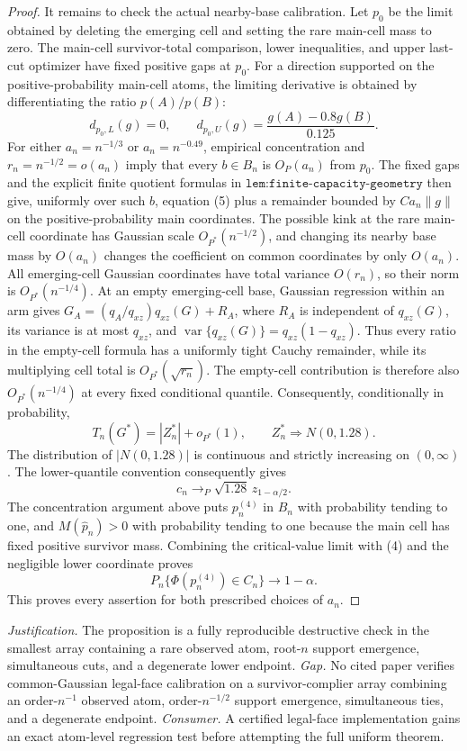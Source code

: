\documentclass{article}
\begin{document}
\begin{proof}
It remains to check the actual nearby-base calibration.  Let \(p_0\) be the limit obtained by deleting the emerging cell and setting the rare main-cell mass to zero.  The main-cell survivor-total comparison, lower inequalities, and upper last-cut optimizer have fixed positive gaps at \(p_0\).  For a direction supported on the positive-probability main-cell atoms, the limiting derivative is obtained by differentiating the ratio \(p(A)/p(B)\):
\[
d_{p_0,L}(g)=0,
\qquad
d_{p_0,U}(g)=\frac{g(A)-0.8g(B)}{0.125}.
\tag{5}
\]
For either \(a_n=n^{-1/3}\) or \(a_n=n^{-0.49}\), empirical concentration and \(r_n=n^{-1/2}=o(a_n)\) imply that every \(b\in B_n\) is \(O_P(a_n)\) from \(p_0\).  The fixed gaps and the explicit finite quotient formulas in \(\texttt{lem:finite-capacity-geometry}\) then give, uniformly over such \(b\), equation (5) plus a remainder bounded by \(C a_n\|g\|\) on the positive-probability main coordinates.  The possible kink at the rare main-cell coordinate has Gaussian scale \(O_{P^*}(n^{-1/2})\), and changing its nearby base mass by \(O(a_n)\) changes the coefficient on common coordinates by only \(O(a_n)\).  All emerging-cell Gaussian coordinates have total variance \(O(r_n)\), so their norm is \(O_{P^*}(n^{-1/4})\).  At an empty emerging-cell base, Gaussian regression within an arm gives \(G_A=(q_A/q_{xz})q_{xz}(G)+R_A\), where \(R_A\) is independent of \(q_{xz}(G)\), its variance is at most \(q_{xz}\), and \(\operatorname{var}\{q_{xz}(G)\}=q_{xz}(1-q_{xz})\).  Thus every ratio in the empty-cell formula has a uniformly tight Cauchy remainder, while its multiplying cell total is \(O_{P^*}(\sqrt{r_n})\).  The empty-cell contribution is therefore also \(O_{P^*}(n^{-1/4})\) at every fixed conditional quantile.  Consequently, conditionally in probability,
\[
T_n(G^*)=|Z_n^*|+o_{P^*}(1),
\qquad
Z_n^*\Rightarrow N(0,1.28).
\]
The distribution of \(|N(0,1.28)|\) is continuous and strictly increasing on \((0,\infty)\).  The lower-quantile convention consequently gives
\[
c_n\to_P\sqrt{1.28}\,z_{1-\alpha/2}.
\]
The concentration argument above puts \(p_n^{(4)}\) in \(B_n\) with probability tending to one, and \(M(\widehat p_n)>0\) with probability tending to one because the main cell has fixed positive survivor mass.  Combining the critical-value limit with (4) and the negligible lower coordinate proves
\[
P_n\{\Phi(p_n^{(4)})\in C_n\}\longrightarrow1-\alpha.
\]
This proves every assertion for both prescribed choices of \(a_n\).
\end{proof}
\par\smallskip\noindent \textit{Justification.} The proposition is a fully reproducible destructive check in the smallest array containing a rare observed atom, root-\(n\) support emergence, simultaneous cuts, and a degenerate lower endpoint. \textit{Gap.} No cited paper verifies common-Gaussian legal-face calibration on a survivor-complier array combining an order-\(n^{-1}\) observed atom, order-\(n^{-1/2}\) support emergence, simultaneous ties, and a degenerate endpoint. \textit{Consumer.} A certified legal-face implementation gains an exact atom-level regression test before attempting the full uniform theorem.
\end{document}
